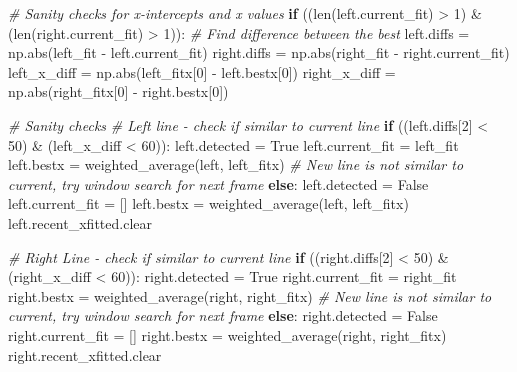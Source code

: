 \documentclass[11pt]{article}
\newenvironment{Shaded}{}{}
\newcommand{\DecValTok}[1]{\textcolor[rgb]{0.25,0.63,0.44}{{#1}}}
\newcommand{\CommentTok}[1]{\textcolor[rgb]{0.38,0.63,0.69}{\textit{{#1}}}}
\newcommand{\NormalTok}[1]{{#1}}
\newcommand{\VariableTok}[1]{\textcolor[rgb]{0.10,0.09,0.49}{{#1}}}
\newcommand{\ControlFlowTok}[1]{\textcolor[rgb]{0.00,0.44,0.13}{\textbf{{#1}}}}
\newcommand{\OperatorTok}[1]{\textcolor[rgb]{0.40,0.40,0.40}{{#1}}}
\newcommand{\BuiltInTok}[1]{{#1}}
\begin{document}
\begin{Shaded}
\begin{Highlighting}[]
\CommentTok{# Sanity checks for x-intercepts and x values }
\ControlFlowTok{if}\NormalTok{ ((}\BuiltInTok{len}\NormalTok{(left.current_fit) }\OperatorTok{>} \DecValTok{1}\NormalTok{) }\OperatorTok{&}\NormalTok{ (}\BuiltInTok{len}\NormalTok{(right.current_fit) }\OperatorTok{>} \DecValTok{1}\NormalTok{)):}
    \CommentTok{# Find difference between the best }
\NormalTok{    left.diffs }\OperatorTok{=}\NormalTok{ np.}\BuiltInTok{abs}\NormalTok{(left_fit }\OperatorTok{-}\NormalTok{ left.current_fit)}
\NormalTok{    right.diffs }\OperatorTok{=}\NormalTok{ np.}\BuiltInTok{abs}\NormalTok{(right_fit }\OperatorTok{-}\NormalTok{ right.current_fit)}
\NormalTok{    left_x_diff }\OperatorTok{=}\NormalTok{ np.}\BuiltInTok{abs}\NormalTok{(left_fitx[}\DecValTok{0}\NormalTok{] }\OperatorTok{-}\NormalTok{ left.bestx[}\DecValTok{0}\NormalTok{])}
\NormalTok{    right_x_diff }\OperatorTok{=}\NormalTok{ np.}\BuiltInTok{abs}\NormalTok{(right_fitx[}\DecValTok{0}\NormalTok{] }\OperatorTok{-}\NormalTok{ right.bestx[}\DecValTok{0}\NormalTok{])}

    \CommentTok{# Sanity checks}
    \CommentTok{# Left line - check if similar to current line}
    \ControlFlowTok{if}\NormalTok{ ((left.diffs[}\DecValTok{2}\NormalTok{] }\OperatorTok{<} \DecValTok{50}\NormalTok{) }\OperatorTok{&}\NormalTok{ (left_x_diff }\OperatorTok{<} \DecValTok{60}\NormalTok{)):}
\NormalTok{        left.detected }\OperatorTok{=} \VariableTok{True}
\NormalTok{        left.current_fit }\OperatorTok{=}\NormalTok{ left_fit}
\NormalTok{        left.bestx }\OperatorTok{=}\NormalTok{ weighted_average(left, left_fitx)}
    \CommentTok{# New line is not similar to current, try window search for next frame }
    \ControlFlowTok{else}\NormalTok{:}
\NormalTok{        left.detected }\OperatorTok{=} \VariableTok{False}
\NormalTok{        left.current_fit }\OperatorTok{=}\NormalTok{ []}
\NormalTok{        left.bestx }\OperatorTok{=}\NormalTok{ weighted_average(left, left_fitx)}
\NormalTok{        left.recent_xfitted.clear}

    \CommentTok{# Right Line - check if similar to current line}
    \ControlFlowTok{if}\NormalTok{ ((right.diffs[}\DecValTok{2}\NormalTok{] }\OperatorTok{<} \DecValTok{50}\NormalTok{) }\OperatorTok{&}\NormalTok{ (right_x_diff }\OperatorTok{<} \DecValTok{60}\NormalTok{)):}
\NormalTok{        right.detected }\OperatorTok{=} \VariableTok{True}
\NormalTok{        right.current_fit }\OperatorTok{=}\NormalTok{ right_fit}
\NormalTok{        right.bestx }\OperatorTok{=}\NormalTok{ weighted_average(right, right_fitx)}
    \CommentTok{# New line is not similar to current, try window search for next frame }
    \ControlFlowTok{else}\NormalTok{:}
\NormalTok{        right.detected }\OperatorTok{=} \VariableTok{False}
\NormalTok{        right.current_fit }\OperatorTok{=}\NormalTok{ []}
\NormalTok{        right.bestx }\OperatorTok{=}\NormalTok{ weighted_average(right, right_fitx)}
\NormalTok{        right.recent_xfitted.clear}


\end{Highlighting}
\end{Shaded}
\end{document}
